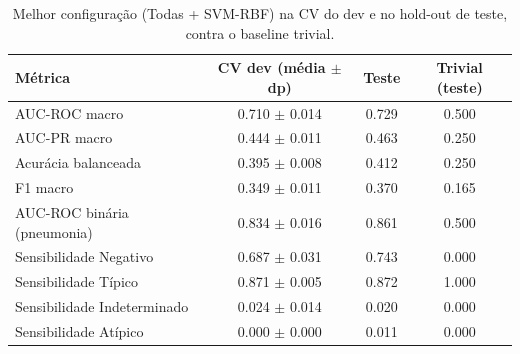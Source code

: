 \begin{table}[ht]
\centering
\caption{Melhor configuração (Todas + SVM-RBF) na CV do dev e no hold-out de teste, contra o baseline trivial.}
\label{tab:test}
\small
\begin{tabular}{lccc}
\hline
Métrica & CV dev (média $\pm$ dp) & Teste & Trivial (teste) \\
\hline
AUC-ROC macro & 0.710 $\pm$ 0.014 & 0.729 & 0.500 \\
AUC-PR macro & 0.444 $\pm$ 0.011 & 0.463 & 0.250 \\
Acurácia balanceada & 0.395 $\pm$ 0.008 & 0.412 & 0.250 \\
F1 macro & 0.349 $\pm$ 0.011 & 0.370 & 0.165 \\
AUC-ROC binária (pneumonia) & 0.834 $\pm$ 0.016 & 0.861 & 0.500 \\
Sensibilidade Negativo & 0.687 $\pm$ 0.031 & 0.743 & 0.000 \\
Sensibilidade Típico & 0.871 $\pm$ 0.005 & 0.872 & 1.000 \\
Sensibilidade Indeterminado & 0.024 $\pm$ 0.014 & 0.020 & 0.000 \\
Sensibilidade Atípico & 0.000 $\pm$ 0.000 & 0.011 & 0.000 \\
\hline
\end{tabular}
\end{table}